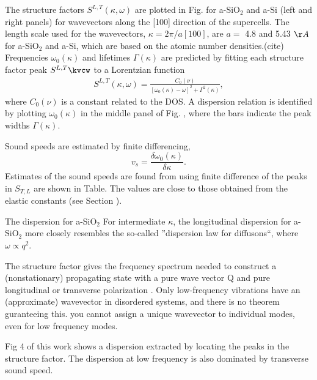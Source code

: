 \documentclass[aps,prb,twocolumn,superscriptaddress,footinbib,amsmath,amssymb,floatfix]{revtex4}
\begin{document}
The structure factors $S^{L,T}(\kappa,\omega)$ are plotted in Fig. for 
a-SiO$_2$ and a-Si (left and right panels) for wavevectors along the 
[100] direction of the 
supercells. The length scale used for the wavevectors, $\kappa = 2\pi/a[100]$,
are $a = $ 4.8 and 5.43 $\AA$ for a-SiO$_2$ and a-Si, which are based 
on the atomic number densities.(cite) 
Frequencies $\omega_0(\kappa)$ and lifetimes $\Gamma(\kappa)$ are predicted 
by fitting each structure 
factor peak $S^{L,T}\kvcw$ to a Lorentzian function
\begin{equation}\label{EQ:Lorentzian_SLT}
\begin{split}
S^{L,T}(\kappa,\omega) = 
\frac{C_0(\nu)}{[\omega_0(\kappa)-\omega]^2+\Gamma^2(\kappa)},
\end{split}
\end{equation}
where $C_0(\nu)$ is a constant related to the DOS.
\cite{beltukov_ioffe-regel_2013} A dispersion relation is identified by 
plotting $\omega_0(\kappa)$ in the middle panel of Fig. , where the bars 
indicate the peak widths $\Gamma(\kappa)$. 

Sound speeds are estimated by finite differencing, 
\begin{equation}\label{EQ:vs_dwdk}
v_{s} = \frac{ \delta \omega_0(\kappa)}{\delta \kappa}.
\end{equation}
Estimates of the sound speeds are found from using finite difference 
of the peaks in $S_{T,L}$ are shown in Table. The values are close to 
those obtained from the elastic constants (see Section ). 

The dispersion for a-SiO$_2$ 
For intermediate $\kappa$, the longitudinal dispersion for a-SiO$_2$ 
more closely resembles 
the so-called ''dispersion law for diffusons``, where $\omega \propto q^2$.
\cite{beltukov_ioffe-regel_2013}

The structure factor gives the frequency spectrum
needed to construct a (nonstationary) propagating state with a
pure wave vector Q and pure longitudinal or transverse polarization
 \cite{feldman_thermal_1993}. Only low-frequency vibrations 
have an (approximate) wavevector in disordered systems, and there is 
no theorem guranteeing this. \cite{feldman_numerical_1999}
you cannot assign a unique wavevector to individual modes, 
even for low frequency modes.
\cite{biswas_vibrational_1988,feldman_thermal_1993,silbert_normal_2009}

Fig 4 of this work shows a dispersion extracted by locating the peaks in 
the structure factor. The dispersion at low 
frequency is also dominated by transverse sound speed.\cite{vitelli_heat_2010} 
\end{document}
